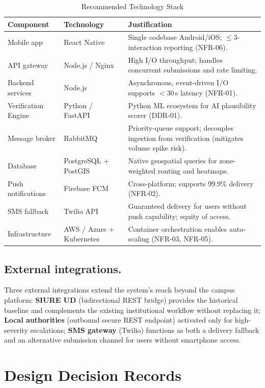 \documentclass[12pt,a4paper]{article}
\begin{document}
\begin{table}[h]
\caption{Recommended Technology Stack}
\label{tab:stack}
\centering
\begin{tabularx}{\textwidth}{llX}
\toprule
\textbf{Component} & \textbf{Technology} & \textbf{Justification} \\
\midrule
Mobile app & React Native & Single codebase Android/iOS; $\leq$3-interaction reporting (NFR-06). \\
API gateway & Node.js / Nginx & High I/O throughput; handles concurrent submissions and rate limiting. \\
Backend services & Node.js & Asynchronous, event-driven I/O supports $<$30\,s latency (NFR-01). \\
Verification Engine & Python / FastAPI & Python ML ecosystem for AI plausibility scorer (DDR-01). \\
Message broker & RabbitMQ & Priority-queue support; decouples ingestion from verification (mitigates volume spike risk). \\
Database & PostgreSQL + PostGIS & Native geospatial queries for zone-weighted routing and heatmaps. \\
Push notifications & Firebase FCM & Cross-platform; supports 99.9\% delivery (NFR-02). \\
SMS fallback & Twilio API & Guaranteed delivery for users without push capability; equity of access. \\
Infrastructure & AWS / Azure + Kubernetes & Container orchestration enables auto-scaling (NFR-03, NFR-05). \\
\bottomrule
\end{tabularx}
\end{table}

\subsection{External integrations.}
Three external integrations extend the system's reach beyond the
campus platform:
\textbf{SIURE UD} (bidirectional REST bridge) provides the historical
baseline and complements the existing institutional workflow without
replacing it;
\textbf{Local authorities} (outbound secure REST endpoint) activated
only for high-severity escalations;
\textbf{SMS gateway} (Twilio) functions as both a delivery fallback
and an alternative submission channel for users without smartphone
access.

\section{Design Decision Records}
\label{sec:ddr}
\end{document}
